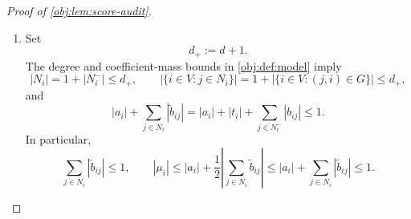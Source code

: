 \documentclass[11pt]{article}
\begin{document}
\begin{proof}[Proof of \cref{obj:lem:score-audit}]
\begin{enumerate}
For any subsets \(E_1,E_2\subseteq V\), independence and centering imply
\[
\mathbb E_Z\!\left[
\left(\prod_{j\in E_1}(Z_j-\tfrac12)\right)
\left(\prod_{k\in E_2}(Z_k-\tfrac12)\right)
\right]
=
\begin{cases}
4^{-|E_1|},&E_1=E_2,\\
0,&E_1\ne E_2.
\end{cases}
\]
Indeed, when the sets agree, every factor is a square equal to \(1/4\). When they differ, a coordinate in their symmetric difference contributes an independent factor with mean zero. Using
\[
\prod_{j\in E_1}X_j
=2^{|E_1|}\prod_{j\in E_1}(Z_j-\tfrac12)
\]
and the corresponding identity for \(E_2\), we obtain
\[
\mathbb E_Z\!\left[
\left(\prod_{j\in E_1}X_j\right)
\left(\prod_{k\in E_2}X_k\right)
\right]
=\mathbf1_{\{E_1=E_2\}}.
\]
The empty product equals one, so these formulas include empty sets.

In particular,
\[
\mathbb E_Z[X_\ell X_jX_k]=0
\qquad(\ell,j,k\in V,\ j\ne k),
\]
because the singleton \(\{\ell\}\) differs from the two-element set \(\{j,k\}\). Expanding the collected linear term against the quadratic term expresses every summand of their cross moment as a constant times such a triple moment. Hence
\[
\mathbb E_Z[2T_{G,\mathrm{lin}}T_{G,\mathrm{quad}}]=0,
\qquad
\operatorname{Var}_Z(T_G)
=\mathbb E_Z[T_{G,\mathrm{lin}}^2]
+\mathbb E_Z[T_{G,\mathrm{quad}}^2].
\]

\item Set
\[
d_+:=d+1.
\]
The degree and coefficient-mass bounds in \cref{obj:def:model} imply
\[
|N_i|=1+|N_i^-|\le d_+,
\qquad
\left|\{i\in V:j\in N_i\}\right|
=1+\left|\{i\in V:(j,i)\in G\}\right|
\le d_+,
\]
and
\[
|a_i|+\sum_{j\in N_i}|\widetilde b_{ij}|
=
|a_i|+|t_i|+\sum_{j\in N_i^-}|b_{ij}|
\le1.
\]
In particular,
\[
\sum_{j\in N_i}|\widetilde b_{ij}|\le1,
\qquad
|\mu_i|
\le |a_i|+\frac12\left|\sum_{j\in N_i}\widetilde b_{ij}\right|
\le |a_i|+\sum_{j\in N_i}|\widetilde b_{ij}|
\le1.
\]


\end{enumerate}
\end{proof}
\end{document}
